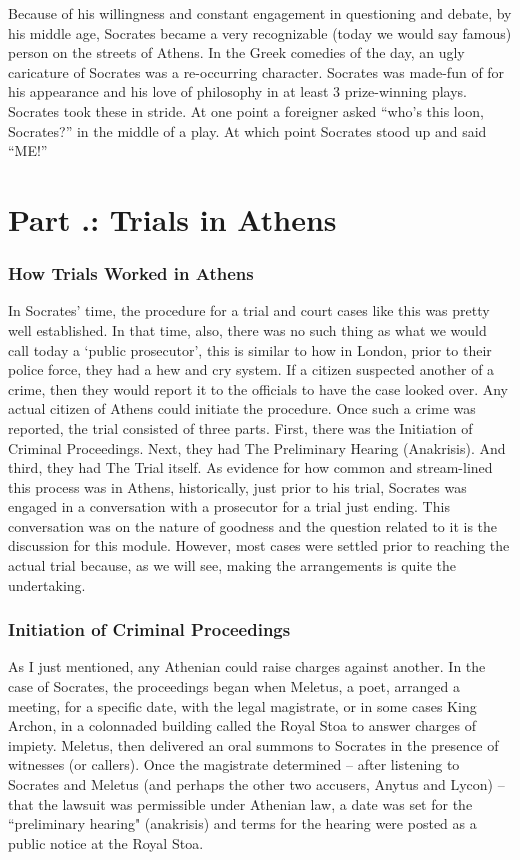 Because of his willingness and constant engagement in questioning and debate, by his middle age, Socrates became a very recognizable (today we would say famous) person on the streets of Athens. In the Greek comedies of the day, an ugly caricature of Socrates was a re-occurring character. Socrates was made-fun of for his appearance and his love of philosophy in at least 3 prize-winning plays. Socrates took these in stride. At one point a foreigner asked “who’s this loon, Socrates?” in the middle of a play. At which point Socrates stood up and said “ME!”

\section{Part \thechapcount.\theseccount: Trials in Athens}

\subsubsection{How Trials Worked in Athens}

In Socrates' time, the procedure for a trial and court cases like this was pretty well established. In that time, also, there was no such thing as what we would call today a `public prosecutor', this is similar to how in London, prior to their police force, they had a hew and cry system. If a citizen suspected another of a crime, then they would report it to the officials to have the case looked over. Any actual citizen of Athens could initiate the procedure. Once such a crime was reported, the trial consisted of three parts. First, there was the Initiation of Criminal Proceedings. Next, they had The Preliminary Hearing (Anakrisis). And third, they had The Trial itself. As evidence for how common and stream-lined this process was in Athens, historically, just prior to his trial, Socrates was engaged in a conversation with a prosecutor for a trial just ending. This conversation was on the nature of goodness and the question related to it is the discussion for this module. However, most cases were settled prior to reaching the actual trial because, as we will see, making the arrangements is quite the undertaking.
\subsubsection{Initiation of Criminal Proceedings}

As I just mentioned, any Athenian could raise charges against another. In the case of Socrates, the proceedings began when Meletus, a poet, arranged a meeting, for a specific date, with the legal magistrate, or in some cases King Archon, in a colonnaded building called the Royal Stoa to answer charges of impiety. Meletus, then delivered an oral summons to Socrates in the presence of witnesses (or callers). Once the magistrate determined – after listening to Socrates and Meletus (and perhaps the other two accusers, Anytus and Lycon) – that the lawsuit was permissible under Athenian law, a date was set for the ``preliminary hearing" (anakrisis) and terms for the hearing were posted as a public notice at the Royal Stoa.

